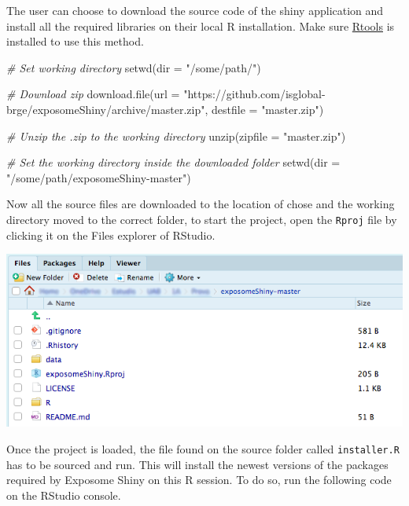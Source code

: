 \documentclass[
]{book}
\newenvironment{Shaded}{\begin{snugshade}}{\end{snugshade}}
\newcommand{\AttributeTok}[1]{\textcolor[rgb]{0.77,0.63,0.00}{#1}}
\newcommand{\CommentTok}[1]{\textcolor[rgb]{0.56,0.35,0.01}{\textit{#1}}}
\newcommand{\FunctionTok}[1]{\textcolor[rgb]{0.00,0.00,0.00}{#1}}
\newcommand{\NormalTok}[1]{#1}
\newcommand{\StringTok}[1]{\textcolor[rgb]{0.31,0.60,0.02}{#1}}
\begin{document}
The user can choose to download the source code of the shiny application and install all the required libraries on their local R installation. Make sure \href{https://cran.r-project.org/bin/windows/Rtools/history.html}{Rtools} is installed to use this method.

\begin{Shaded}
\begin{Highlighting}[]
  \CommentTok{\# Set working directory}
\FunctionTok{setwd}\NormalTok{(}\AttributeTok{dir =} \StringTok{"/some/path/"}\NormalTok{)}
      
  \CommentTok{\# Download zip}
\FunctionTok{download.file}\NormalTok{(}\AttributeTok{url =} \StringTok{"https://github.com/isglobal{-}brge/exposomeShiny/archive/master.zip"}\NormalTok{, }\AttributeTok{destfile =} \StringTok{"master.zip"}\NormalTok{)}

  \CommentTok{\# Unzip the .zip to the working directory}
\FunctionTok{unzip}\NormalTok{(}\AttributeTok{zipfile =} \StringTok{"master.zip"}\NormalTok{)}

  \CommentTok{\# Set the working directory inside the downloaded folder}
\FunctionTok{setwd}\NormalTok{(}\AttributeTok{dir =} \StringTok{"/some/path/exposomeShiny{-}master"}\NormalTok{)}
\end{Highlighting}
\end{Shaded}

Now all the source files are downloaded to the location of chose and the working directory moved to the correct folder, to start the project, open the \texttt{Rproj} file by clicking it on the Files explorer of RStudio.

\includegraphics{images/setup1.png}

Once the project is loaded, the file found on the source folder called \texttt{installer.R} has to be sourced and run. This will install the newest versions of the packages required by Exposome Shiny on this R session. To do so, run the following code on the RStudio console.
\end{document}

